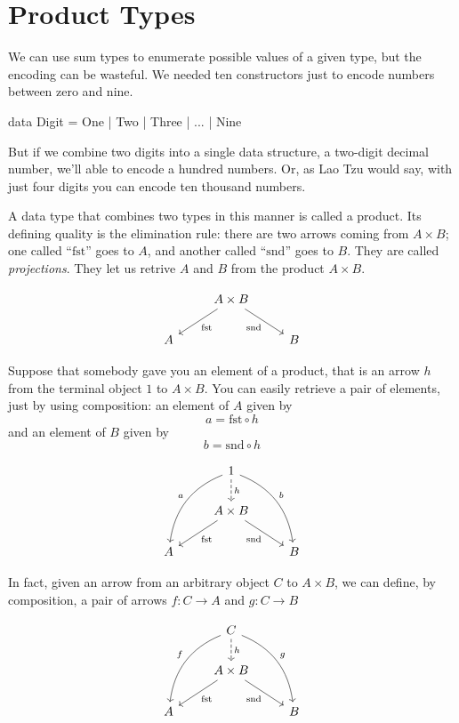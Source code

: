 \documentclass[DaoFP]{subfiles}
\begin{document}
\setcounter{chapter}{4}

\chapter{Product Types}

We can use sum types to enumerate possible values of a given type, but the encoding can be wasteful. We needed ten constructors just to encode numbers between zero and nine.
\begin{haskell}
data Digit = One | Two | Three | ... | Nine
\end{haskell}
But if we combine two digits into a single data structure, a two-digit decimal number, we'll able to encode a hundred numbers. Or, as Lao Tzu would say, with just four digits you can encode ten thousand numbers.

A data type that combines two types in this manner is called a product. Its defining quality is the elimination rule: there are two arrows coming from $A \times B$; one called ``$\text{fst}$'' goes to $A$, and another called ``$\text{snd}$'' goes to $B$. They are called \emph{projections}. They let us retrive $A$ and $B$ from the product $A \times B$.

\[
 \begin{tikzcd}
& A \times B
 \arrow[dl,  "\text{fst}"]
 \arrow[dr,   "\text{snd}"']
\\
A && B
 \end{tikzcd}
\]

Suppose that somebody gave you an element of a product, that is an arrow $h$ from the terminal object $1$ to $A \times B$. You can easily retrieve a pair of elements, just by using composition: an element of $A$ given by 
\[a = \text{fst} \circ h \]
and an element of $B$ given by
\[b = \text{snd} \circ h \]

\[
 \begin{tikzcd}
 & 1
\arrow[d, dashed, "h"]
 \arrow[ddl, bend right, "a"']
 \arrow[ddr, bend left, "b"]
\\
&A \times B
 \arrow[dl,  "\text{fst}"]
 \arrow[dr,   "\text{snd}"']
\\
A && B
 \end{tikzcd}
\]

In fact, given an arrow from an arbitrary object $C$ to $A \times B$, we can define, by composition, a pair of arrows $f \colon C \to A$ and $g \colon C \to B$

\[
 \begin{tikzcd}
 & C
\arrow[d, dashed, "h"]
 \arrow[ddl, bend right, "f"']
 \arrow[ddr, bend left, "g"]
\\
&A \times B
 \arrow[dl,  "\text{fst}"]
  \arrow[dr,   "\text{snd}"']
\\
A && B
 \end{tikzcd}
\]
\end{document}
